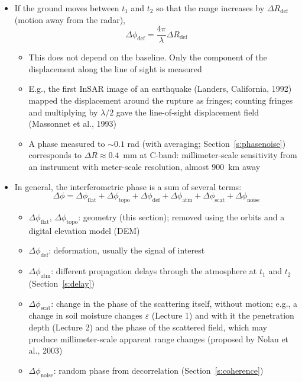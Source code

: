 \documentclass[11pt, oneside]{article}
\begin{document}
\begin{itemize}
	\item If the ground moves between $t_1$ and $t_2$ so that the range increases by $\Delta R_\mathrm{def}$ (motion away from the radar),
	\begin{equation}
		\label{e:def}
		\Delta\phi_\mathrm{def} = \frac{4\pi}{\lambda}\Delta R_\mathrm{def}
	\end{equation}
	\begin{itemize}
		\item[$\bigstar$] This does not depend on the baseline. Only the component of the displacement along the line of sight is measured
		\item E.g., the first InSAR image of an earthquake (Landers, California, 1992) mapped the displacement around the rupture as fringes; counting fringes and multiplying by $\lambda/2$ gave the line-of-sight displacement field (Massonnet et al., 1993)
		\item[$\bigstar$] A phase measured to $\sim$$0.1$ rad (with averaging; Section~\ref{s:phasenoise}) corresponds to $\Delta R \approx 0.4$~mm at C-band: millimeter-scale sensitivity from an instrument with meter-scale resolution, almost 900~km away
	\end{itemize}
	\item In general, the interferometric phase is a sum of several terms:
	\begin{equation}
		\label{e:decomp}
		\Delta\phi = \Delta\phi_\mathrm{flat} + \Delta\phi_\mathrm{topo} + \Delta\phi_\mathrm{def} + \Delta\phi_\mathrm{atm} + \Delta\phi_\mathrm{scat} + \Delta\phi_\mathrm{noise}
	\end{equation}
	\begin{itemize}
		\item[] $\Delta\phi_\mathrm{flat}$, $\Delta\phi_\mathrm{topo}$: geometry (this section); removed using the orbits and a digital elevation model (DEM)
		\item[] $\Delta\phi_\mathrm{def}$: deformation, usually the signal of interest
		\item[] $\Delta\phi_\mathrm{atm}$: different propagation delays through the atmosphere at $t_1$ and $t_2$ (Section~\ref{s:delay})
		\item[] $\Delta\phi_\mathrm{scat}$: change in the phase of the scattering itself, without motion; e.g., a change in soil moisture changes $\varepsilon$ (Lecture 1) and with it the penetration depth (Lecture 2) and the phase of the scattered field, which may produce millimeter-scale apparent range changes (proposed by Nolan et al., 2003)
		\item[] $\Delta\phi_\mathrm{noise}$: random phase from decorrelation (Section~\ref{s:coherence})
	\end{itemize}
\end{itemize}
\end{document}
